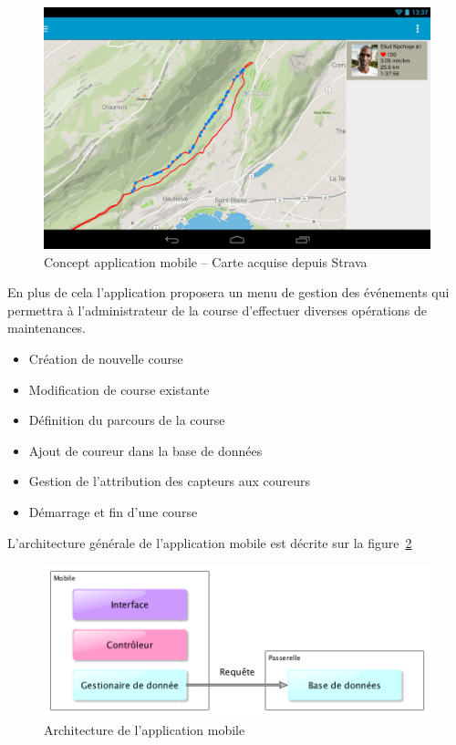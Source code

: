 \begin{figure}[htb]
\centering 
\includegraphics[width=0.8\columnwidth]{../images/app_mock.png} 
\caption[Esquisse Application]{Concept application mobile – Carte acquise depuis Strava}
\label{fig:esquisse_app}
\end{figure}

En plus de cela l’application proposera un menu de gestion des événements qui permettra à l’administrateur de la course d’effectuer diverses opérations de maintenances.

\begin{itemize}
\item Création de nouvelle course
\item Modification de course existante
\item Définition du parcours de la course
\item Ajout de coureur dans la base de données
\item Gestion de l’attribution des capteurs aux coureurs
\item Démarrage et fin d’une course
\end{itemize}

L'architecture générale de l'application mobile est décrite sur la figure~\ref{fig:archi_app}

\begin{figure}[htb]
\centering 
\includegraphics[width=0.8\columnwidth]{../images/archi_app.png} 
\caption[Architecture Application]{Architecture de l’application mobile}
\label{fig:archi_app}
\end{figure}
